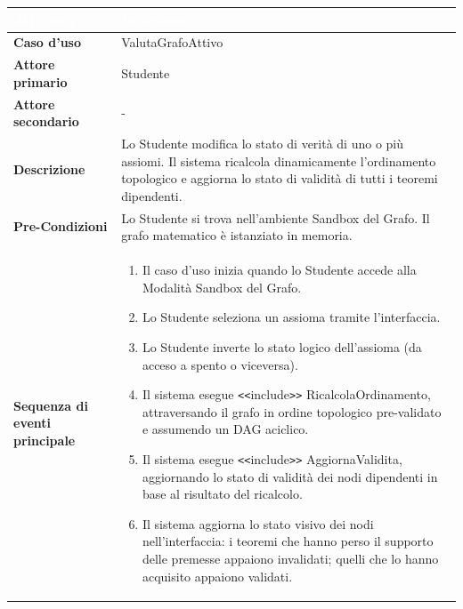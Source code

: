 \documentclass[12pt,a4paper]{article}
\begin{document}
\begin{table}[H]
    \centering
    \small
    \begin{tabularx}{\textwidth}{|l|X|}
        \hline
        \rowcolor{PrimaryBlue} \textcolor{white}{\textbf{Attributo}} & \textcolor{white}{\textbf{Descrizione}} \\
        \hline
        \textbf{Caso d'uso} & ValutaGrafoAttivo \\
        \hline
        \rowcolor{CodeBg} \textbf{Attore primario} & Studente \\
        \hline
        \textbf{Attore secondario} & - \\
        \hline
        \rowcolor{CodeBg} \textbf{Descrizione} & Lo Studente modifica lo stato di verità di uno o più assiomi. Il sistema ricalcola dinamicamente l'ordinamento topologico e aggiorna lo stato di validità di tutti i teoremi dipendenti. \\
        \hline
        \textbf{Pre-Condizioni} & Lo Studente si trova nell'ambiente Sandbox del Grafo. Il grafo matematico è istanziato in memoria. \\
        \hline
        \rowcolor{CodeBg} \textbf{Sequenza di eventi principale} & 
        \begin{minipage}{\linewidth}
        \begin{enumerate}
            \item Il caso d'uso inizia quando lo Studente accede alla Modalità Sandbox del Grafo.
            \item Lo Studente seleziona un assioma tramite l'interfaccia.
            \item Lo Studente inverte lo stato logico dell'assioma (da acceso a spento o viceversa).
            \item Il sistema esegue \texttt{<}\texttt{<}include\texttt{>}\texttt{>} RicalcolaOrdinamento, attraversando il grafo in ordine topologico pre-validato e assumendo un DAG aciclico.
            \item Il sistema esegue \texttt{<}\texttt{<}include\texttt{>}\texttt{>} AggiornaValidita, aggiornando lo stato di validità dei nodi dipendenti in base al risultato del ricalcolo.
            \item Il sistema aggiorna lo stato visivo dei nodi nell'interfaccia: i teoremi che hanno perso il supporto delle premesse appaiono invalidati; quelli che lo hanno acquisito appaiono validati.
        \end{enumerate}
        \end{minipage} \\

\end{tabularx}
\end{table}
\end{document}

